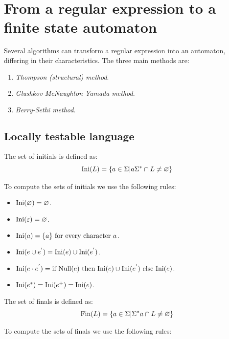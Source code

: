 \section{From a regular expression to a finite state automaton}

Several algorithms can transform a regular expression into an automaton, differing in their characteristics. 
The three main methods are:
\begin{enumerate}
    \item \textit{Thompson (structural) method}.
    \item \textit{Glushkov McNaughton Yamada method}.
    \item \textit{Berry-Sethi method}.
\end{enumerate}

\subsection{Locally testable language}
\begin{definition}
    The set of initials is defined as: 
    \[\textnormal{Ini}(L)=\{a \in \Sigma | a\Sigma^{*}\cap L \neq \varnothing\}\]
\end{definition}
To compute the sets of initials we use the following rules: 
\begin{itemize}
    \item $\textnormal{Ini}(\varnothing)=\varnothing$.
    \item $\textnormal{Ini}(\varepsilon)=\varnothing$.
    \item $\textnormal{Ini}(a)=\{a\} \textnormal{ for every character }a$.
    \item $\textnormal{Ini}(e \cup e^{'})=\textnormal{Ini}(e) \cup \textnormal{Ini}(e^{'})$.
    \item $\textnormal{Ini}(e \cdot e^{'})=\textnormal{if Null}(e) \textnormal{ then Ini}(e)\cup\textnormal{Ini}(e^{'}) \textnormal{ else Ini}(e)$.
    \item $\textnormal{Ini}(e^{*})=\textnormal{Ini}(e^{+})=\textnormal{Ini}(e)$.
\end{itemize}
\begin{definition}
    The set of finals is defined as: 
    \[\textnormal{Fin}(L)=\{a \in \Sigma | \Sigma^{*}a\cap L \neq \varnothing\}\]
\end{definition}
To compute the sets of finals we use the following rules: 
